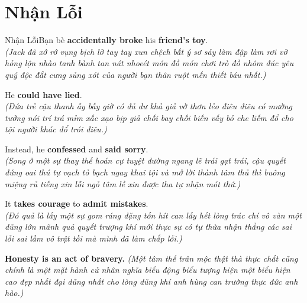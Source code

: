 \section{Nhận Lỗi}
\begin{truyen}{Nhận Lỗi}{Bạn bè}
 \textbf{accidentally broke} his \textbf{friend's toy}.\\
\textit{(Jack đã xớ rớ vụng bịch lỡ tay tay xun chệch bất ý sơ sảy làm đập làm rơi vỡ hỏng lộn nhào tanh bành tan nát nhoeét món đồ món chơi trò đồ nhôm đúc yêu quý độc đắt cưng sủng xót của người bạn thân ruột mến thiết báu nhất.)}

He \textbf{could have lied}.\\
\textit{(Đứa trẻ cậu thanh ấy bấy giờ có đủ dư khả giả vờ thơn lẻo điêu điêu có mường tưởng nói trí trá mỉm xấc xạo bịp giả chối bay chối biến vấy bỏ che liếm đổ cho tội người khác đổ trói điêu.)}

Instead, he \textbf{confessed} and \textbf{said sorry}.\\
\textit{(Song ở một sự thay thế hoán cự tuyệt đường ngang lẽ trái gạt trái, cậu quyết đứng oai thú tự vạch tỏ bạch ngay khai tội và mở lời thành tâm thủ thì buông miệng rủ tiếng xin lỗi ngỏ tâm lề xin được tha tự nhận mót thứ.)}

It \textbf{takes courage} to \textbf{admit mistakes}.\\
\textit{(Đó quả là lấy một sự gom ráng đặng tốn hít can lấy hết lòng trác chí vô vàn một dũng lớn mãnh quả quyết trượng khí mới thực sự có tự thừa nhận thẳng các sai lỗi sai lầm vô trật tồi mà mình đã làm chắp lỗi.)}
\end{truyen}

\begin{baihoc}
  \textbf{Honesty is an act of bravery.} \textit{(Một tâm thế trân mộc thật thà thực chất cũng chính là một mặt hành cử nhân nghĩa biểu động biểu tượng hiện một biểu hiện cao đẹp nhất đại dũng nhất cho lòng dũng khí anh hùng can trường thực đức anh hào.)}
\end{baihoc}
